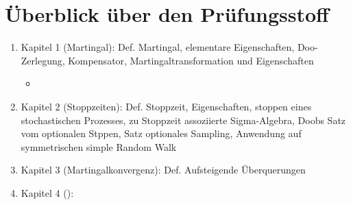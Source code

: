 
\chapter{Überblick über den Prüfungsstoff}

\begin{enumerate}
	\item Kapitel 1 (Martingal):
	Def. Martingal, elementare Eigenschaften, Doo-Zerlegung, Kompensator, Martingaltransformation und Eigenschaften
	\begin{itemize}
		\item 
	\end{itemize}
	\item Kapitel 2 (Stoppzeiten):
	Def. Stoppzeit, Eigenschaften, stoppen eines stochastischen Prozesses, zu Stoppzeit assoziierte Sigma-Algebra, Doobs Satz vom optionalen Stppen, Satz optionales Sampling, Anwendung auf symmetrischen simple Random Walk
	\item Kapitel 3 (Martingalkonvergenz):
	Def. Aufsteigende Überquerungen
	\item Kapitel 4 ():
\end{enumerate}
